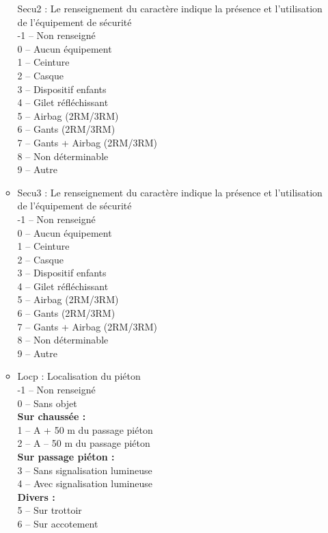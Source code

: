 \documentclass[french,]{tp}
\begin{document}
\begin{itemize}
\begin{itemize}
    Secu2 : Le renseignement du caractère indique la présence et l'utilisation de l'équipement de sécurité\\
    -1 -- Non renseigné\\
    0 -- Aucun équipement\\
    1 -- Ceinture\\
    2 -- Casque\\
    3 -- Dispositif enfants\\
    4 -- Gilet réfléchissant\\
    5 -- Airbag (2RM/3RM)\\
    6 -- Gants (2RM/3RM)\\
    7 -- Gants + Airbag (2RM/3RM)\\
    8 -- Non déterminable\\
    9 -- Autre
  \item
    Secu3 : Le renseignement du caractère indique la présence et l'utilisation de l'équipement de sécurité\\
    -1 -- Non renseigné\\
    0 -- Aucun équipement\\
    1 -- Ceinture\\
    2 -- Casque\\
    3 -- Dispositif enfants\\
    4 -- Gilet réfléchissant\\
    5 -- Airbag (2RM/3RM)\\
    6 -- Gants (2RM/3RM)\\
    7 -- Gants + Airbag (2RM/3RM)\\
    8 -- Non déterminable\\
    9 -- Autre
  \item
    Locp : Localisation du piéton\\
    -1 -- Non renseigné\\
    0 -- Sans objet\\
    \textbf{Sur chaussée :}\\
    1 -- A + 50 m du passage piéton\\
    2 -- A -- 50 m du passage piéton\\
    \textbf{Sur passage piéton :}\\
    3 -- Sans signalisation lumineuse\\
    4 -- Avec signalisation lumineuse\\
    \textbf{Divers :}\\
    5 -- Sur trottoir\\
    6 -- Sur accotement\\

\end{itemize}
\end{itemize}
\end{document}
